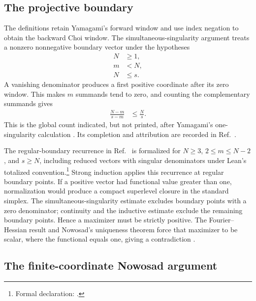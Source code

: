 \documentclass{article}
\begin{document}
\subsection{The projective boundary}

The definitions retain Yamagami's forward window and use index negation to
obtain the backward Choi window. The simultaneous-singularity argument treats
a nonzero nonnegative boundary vector under the hypotheses
\begin{align}
    N
        &\geq 1,
    \label{eq:wolf_ex3_1_choi_positivity_subcase_scope_boundary_dimension}\\
    m
        &<N,
    \label{eq:wolf_ex3_1_choi_positivity_subcase_scope_boundary_window}\\
    N
        &\leq s.
    \label{eq:wolf_ex3_1_choi_positivity_subcase_scope_boundary_parameter}
\end{align}
A vanishing denominator produces a first positive coordinate after its zero
window. This makes $m$ summands tend to zero, and counting the complementary
summands gives
\begin{align}
    \frac{N-m}{s-m}
        &\leq \frac{N}{s}.
    \label{eq:wolf_ex3_1_choi_positivity_subcase_scope_boundary_count}
\end{align}
This is the global count indicated, but not printed, after Yamagami's
one-singularity calculation
\cite[pp.~524--525]{Yamagami1993Cyclic}. Its completion and attribution are
recorded in
Ref.~\cite{gap:yamagami_simultaneous_singularity_boundary}.

The regular-boundary recurrence in Ref.~\cite[p.~525]{Yamagami1993Cyclic} is
formalized for $N\geq 3$, $2\leq m\leq N-2$, and $s\geq N$, including reduced
vectors with singular denominators under Lean's totalized
convention.\footnote{Formal declaration:
.}
Strong induction applies this recurrence at regular boundary points. If a
positive vector had functional value greater than one, normalization would
produce a compact superlevel closure in the standard simplex. The
simultaneous-singularity estimate excludes boundary points with a zero
denominator; continuity and the inductive estimate exclude the remaining
boundary points. Hence a maximizer must be strictly positive. The
Fourier--Hessian result and Nowosad's uniqueness theorem force that maximizer
to be scalar, where the functional equals one, giving a contradiction
\cite{Nowosad1968Isoperimetric,Yamagami1993Cyclic}.

\subsection{The finite-coordinate Nowosad argument}
\end{document}
